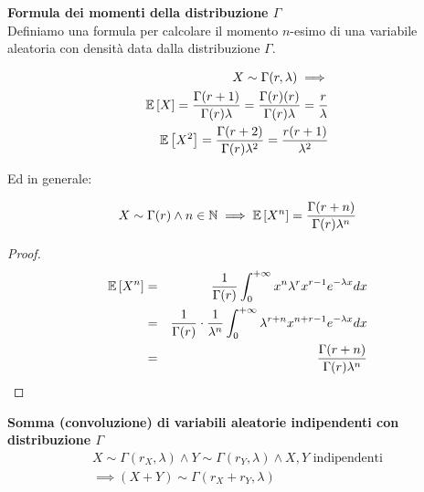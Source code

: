 \begin{defn}
    \textbf{Formula dei momenti della distribuzione $\Gamma$} \\
    Definiamo una formula per calcolare il momento $n$-esimo di una variabile
    aleatoria con densità data dalla distribuzione $\Gamma$.

    \begin{equation*}
        \begin{aligned}
        X \sim \Gamma(r, \lambda) \implies \\
        \mathbb{E}\left[X\right] = \frac{\Gamma(r + 1)}{\Gamma(r) \lambda} = \frac{\Gamma(r) (r)}{\Gamma(r) \lambda} = \frac{r}{\lambda} \\
        \mathbb{E}\left[X^2\right] = \frac{\Gamma(r + 2)}{\Gamma(r) \lambda^2} = \frac{r(r+1)}{\lambda^2}
        \end{aligned}
    \end{equation*}

    Ed in generale:

    \begin{equation*}
        \begin{aligned}
           X \sim \Gamma(r) \land n \in \mathbb{N} \implies \mathbb{E}\left[X^n\right] = \frac{\Gamma(r + n)}{\Gamma(r) \lambda^n}
        \end{aligned}
    \end{equation*}

    \begin{proof}
        \begin{eqnarray*}
            \mathbb{E}\left[X^n\right] &=& \frac{1}{\Gamma(r)} \int_{0}^{+\infty} x^n \lambda^r x^{r-1} e^{-\lambda x} dx  \\
            &=& \frac{1}{\Gamma(r)} \cdot \frac{1}{\lambda^n} \int_{0}^{+\infty} \lambda^{r+n} x^{n + r -1} e^{-\lambda x} dx \\
            &=& \frac{\Gamma(r + n)}{\Gamma(r) \lambda^n}
        \end{eqnarray*}
    \end{proof}

\end{defn}

\begin{defn}
    \textbf{Somma (convoluzione) di variabili aleatorie indipendenti con distribuzione $\Gamma$} \\

    \begin{equation*}
        \begin{aligned}
            X \sim \Gamma(r_X, \lambda) \land Y \sim \Gamma(r_Y, \lambda) \land X,Y \text{  indipendenti} \\
            \implies (X + Y) \sim \Gamma(r_X + r_Y, \lambda)
        \end{aligned}
    \end{equation*}

\end{defn}


